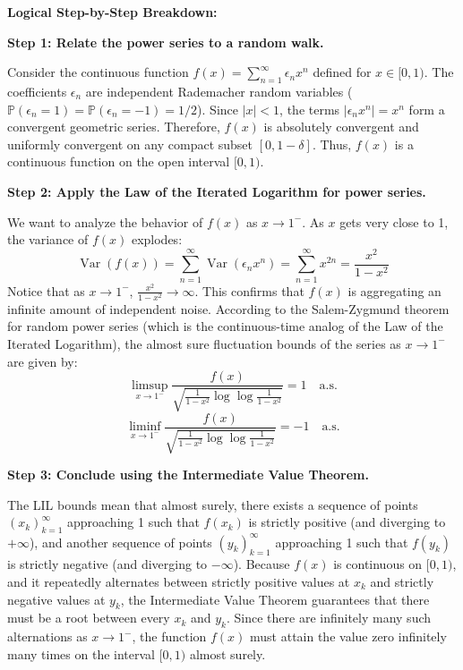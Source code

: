 \begin{solution}
\textbf{Logical Step-by-Step Breakdown:}

\textbf{Step 1: Relate the power series to a random walk.}

Consider the continuous function $f(x) = \sum_{n=1}^\infty \epsilon_n x^n$ defined for $x \in [0, 1)$. The coefficients $\epsilon_n$ are independent Rademacher random variables ($\mathbb{P}(\epsilon_n = 1) = \mathbb{P}(\epsilon_n = -1) = 1/2$).
Since $|x| < 1$, the terms $|\epsilon_n x^n| = x^n$ form a convergent geometric series. Therefore, $f(x)$ is absolutely convergent and uniformly convergent on any compact subset $[0, 1-\delta]$.
Thus, $f(x)$ is a continuous function on the open interval $[0, 1)$.

\textbf{Step 2: Apply the Law of the Iterated Logarithm for power series.}

We want to analyze the behavior of $f(x)$ as $x \to 1^-$. As $x$ gets very close to 1, the variance of $f(x)$ explodes:
\[ \operatorname{Var}(f(x)) = \sum_{n=1}^\infty \operatorname{Var}(\epsilon_n x^n) = \sum_{n=1}^\infty x^{2n} = \frac{x^2}{1-x^2} \]
Notice that as $x \to 1^-$, $\frac{x^2}{1-x^2} \to \infty$. This confirms that $f(x)$ is aggregating an infinite amount of independent noise.
According to the Salem-Zygmund theorem for random power series (which is the continuous-time analog of the Law of the Iterated Logarithm), the almost sure fluctuation bounds of the series as $x \to 1^-$ are given by:
\[ \limsup_{x \to 1^-} \frac{f(x)}{\sqrt{\frac{1}{1-x^2} \log \log \frac{1}{1-x^2}}} = 1 \quad \text{a.s.} \]
\[ \liminf_{x \to 1^-} \frac{f(x)}{\sqrt{\frac{1}{1-x^2} \log \log \frac{1}{1-x^2}}} = -1 \quad \text{a.s.} \]

\textbf{Step 3: Conclude using the Intermediate Value Theorem.}

The LIL bounds mean that almost surely, there exists a sequence of points $(x_k)_{k=1}^\infty$ approaching 1 such that $f(x_k)$ is strictly positive (and diverging to $+\infty$), and another sequence of points $(y_k)_{k=1}^\infty$ approaching 1 such that $f(y_k)$ is strictly negative (and diverging to $-\infty$).
Because $f(x)$ is continuous on $[0, 1)$, and it repeatedly alternates between strictly positive values at $x_k$ and strictly negative values at $y_k$, the Intermediate Value Theorem guarantees that there must be a root between every $x_k$ and $y_k$.
Since there are infinitely many such alternations as $x \to 1^-$, the function $f(x)$ must attain the value zero infinitely many times on the interval $[0, 1)$ almost surely.
\end{solution}

